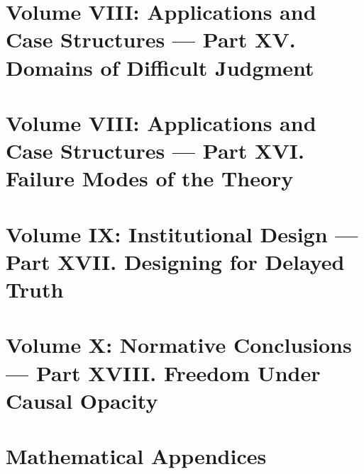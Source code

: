 \documentclass[11pt]{book}
\begin{document}

\part{Volume VIII: Applications and Case Structures --- Part XV. Domains of Difficult Judgment}









\part{Volume VIII: Applications and Case Structures --- Part XVI. Failure Modes of the Theory}









\part{Volume IX: Institutional Design --- Part XVII. Designing for Delayed Truth}











\part{Volume X: Normative Conclusions --- Part XVIII. Freedom Under Causal Opacity}









\appendix
\part{Mathematical Appendices}






\backmatter




\end{document}
